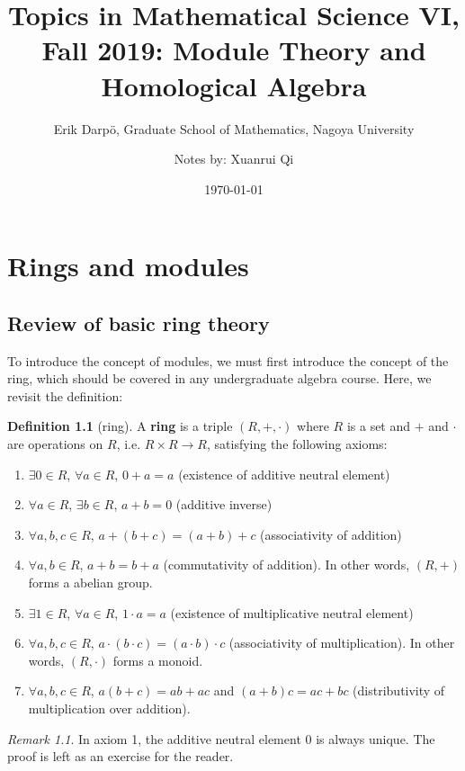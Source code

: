 \documentclass[12pt, a4paper, titlepage]{report}
\title{Topics in Mathematical Science VI, Fall 2019: Module Theory and Homological Algebra}
\date{\today}
\author{Erik Darp\"{o}, Graduate School of Mathematics, Nagoya University
  \and Notes by: Xuanrui Qi}
\theoremstyle{plain} %
\theoremstyle{definition}
\newtheorem{defn}{Definition}[section]
\theoremstyle{remark}
\newtheorem*{rem}{Remark}
\begin{document}
\maketitle

\chapter{Rings and modules}

\section{Review of basic ring theory}

To introduce the concept of modules, we must first introduce the concept of the ring, which
should be covered in any undergraduate algebra course. Here, we revisit the definition:

\begin{defn}[ring]
  A \textbf{ring} is a triple $(R, +, \cdot)$ where $R$ is a set and $+$ and $\cdot$ are operations on $R$, i.e.
  $R \times R \rightarrow R$, satisfying the following axioms:
  \begin{enumerate}
  \item $\exists 0 \in R$, $\forall a \in R$, $0 + a = a$ (existence of additive neutral element)
  \item $\forall a \in R$, $\exists b \in R$, $a + b = 0$ (additive inverse)
  \item $\forall a, b, c \in R$, $a + (b + c) = (a + b) + c$ (associativity of addition)
  \item $\forall a, b \in R$, $a + b = b + a$ (commutativity of addition). In other words, $(R, +)$ forms a
    abelian group.
  \item $\exists 1 \in R$, $\forall a \in R$, $1 \cdot a = a$ (existence of multiplicative neutral element)
  \item $\forall a, b, c \in R$, $a \cdot (b \cdot c) = (a \cdot b) \cdot c$ (associativity of multiplication). In other
    words, $(R, \cdot)$ forms a monoid.
  \item $\forall a, b, c \in R$, $a(b + c) = ab + ac$ and $(a + b)c = ac + bc$ (distributivity of multiplication over
    addition).
  \end{enumerate}
\end{defn}

\begin{rem}
  In axiom 1, the additive neutral element $0$ is always unique. The proof is left as an exercise for the reader.
\end{rem}
\end{document}
